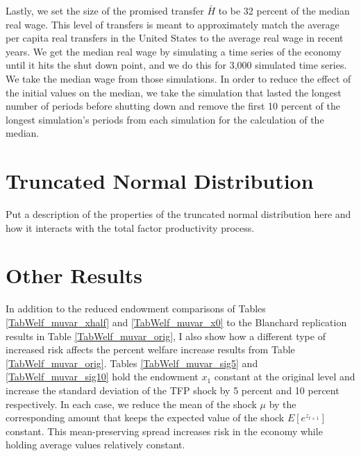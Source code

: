 \documentclass[letterpaper,12pt]{article}
\theoremstyle{definition}
\begin{document}
  Lastly, we set the size of the promised transfer $\bar{H}$ to be 32 percent of the median real wage. This level of transfers is meant to approximately match the average per capita real transfers in the United States to the average real wage in recent years. We get the median real wage by simulating a time series of the economy until it hits the shut down point, and we do this for 3,000 simulated time series. We take the median wage from those simulations. In order to reduce the effect of the initial values on the median, we take the simulation that lasted the longest number of periods before shutting down and remove the first 10 percent of the longest simulation's periods from each simulation for the calculation of the median.


\newpage
\setcounter{equation}{0}                         %
\section{Truncated Normal Distribution}\label{SecTAppTrNdist}

  Put a description of the properties of the truncated normal distribution here and how it interacts with the total factor productivity process.


\newpage
\setcounter{equation}{0}                         %
\section{Other Results}\label{SecTAppOtherResults}

  In addition to the reduced endowment comparisons of Tables \ref{TabWelf_muvar_xhalf} and \ref{TabWelf_muvar_x0} to the Blanchard replication results in Table \ref{TabWelf_muvar_orig}, I also show how a different type of increased risk affects the percent welfare increase results from Table \ref{TabWelf_muvar_orig}. Tables \ref{TabWelf_muvar_sig5} and \ref{TabWelf_muvar_sig10} hold the endowment $x_1$ constant at the original level and increase the standard deviation of the TFP shock by 5 percent and 10 percent respectively. In each case, we reduce the mean of the shock $\mu$ by the corresponding amount that keeps the expected value of the shock $E[e^{z_{t+1}}]$ constant. This mean-preserving spread increases risk in the economy while holding average values relatively constant.
\end{document}
